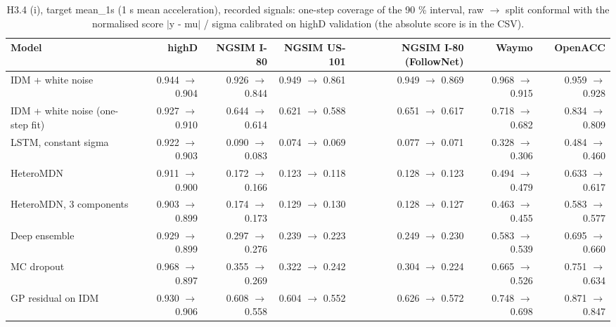 \begin{table}[htbp]
\centering
\footnotesize
\caption{H3.4 (i), target mean\_1s (1 s mean acceleration), recorded signals: one-step coverage of the 90 \% interval, raw $\rightarrow$ split conformal with the normalised score $|$y - mu$|$ / sigma calibrated on highD validation (the absolute score is in the CSV).}
\label{tab:t4-onestep-conformal--raw--mean-1s}
\begin{tabular}{lrrrrrr}
\toprule
Model & highD & NGSIM I-80 & NGSIM US-101 & NGSIM I-80 (FollowNet) & Waymo & OpenACC \\
\midrule
IDM + white noise & 0.944 $\rightarrow$ 0.904 & 0.926 $\rightarrow$ 0.844 & 0.949 $\rightarrow$ 0.861 & 0.949 $\rightarrow$ 0.869 & 0.968 $\rightarrow$ 0.915 & 0.959 $\rightarrow$ 0.928 \\
IDM + white noise (one-step fit) & 0.927 $\rightarrow$ 0.910 & 0.644 $\rightarrow$ 0.614 & 0.621 $\rightarrow$ 0.588 & 0.651 $\rightarrow$ 0.617 & 0.718 $\rightarrow$ 0.682 & 0.834 $\rightarrow$ 0.809 \\
LSTM, constant sigma & 0.922 $\rightarrow$ 0.903 & 0.090 $\rightarrow$ 0.083 & 0.074 $\rightarrow$ 0.069 & 0.077 $\rightarrow$ 0.071 & 0.328 $\rightarrow$ 0.306 & 0.484 $\rightarrow$ 0.460 \\
HeteroMDN & 0.911 $\rightarrow$ 0.900 & 0.172 $\rightarrow$ 0.166 & 0.123 $\rightarrow$ 0.118 & 0.128 $\rightarrow$ 0.123 & 0.494 $\rightarrow$ 0.479 & 0.633 $\rightarrow$ 0.617 \\
HeteroMDN, 3 components & 0.903 $\rightarrow$ 0.899 & 0.174 $\rightarrow$ 0.173 & 0.129 $\rightarrow$ 0.130 & 0.128 $\rightarrow$ 0.127 & 0.463 $\rightarrow$ 0.455 & 0.583 $\rightarrow$ 0.577 \\
Deep ensemble & 0.929 $\rightarrow$ 0.899 & 0.297 $\rightarrow$ 0.276 & 0.239 $\rightarrow$ 0.223 & 0.249 $\rightarrow$ 0.230 & 0.583 $\rightarrow$ 0.539 & 0.695 $\rightarrow$ 0.660 \\
MC dropout & 0.968 $\rightarrow$ 0.897 & 0.355 $\rightarrow$ 0.269 & 0.322 $\rightarrow$ 0.242 & 0.304 $\rightarrow$ 0.224 & 0.665 $\rightarrow$ 0.526 & 0.751 $\rightarrow$ 0.634 \\
GP residual on IDM & 0.930 $\rightarrow$ 0.906 & 0.608 $\rightarrow$ 0.558 & 0.604 $\rightarrow$ 0.552 & 0.626 $\rightarrow$ 0.572 & 0.748 $\rightarrow$ 0.698 & 0.871 $\rightarrow$ 0.847 \\

\end{tabular}
\end{table}
